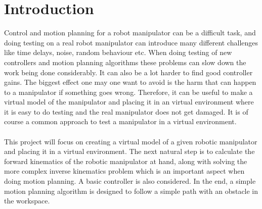 \chapter{Introduction}

Control and motion planning for a robot manipulator can be a difficult task, and doing testing on a real robot manipulator can introduce many different challenges like time delays, noise, random behaviour etc. When doing testing of new controllers and motion planning algorithms these problems can slow down the work being done considerably. It can also be a lot harder to find good controller gains. The biggest effect one may one want to avoid is the harm that can happen to a manipulator if something goes wrong. Therefore, it can be useful to make a virtual model of the manipulator and placing it in an virtual environment where it is easy to do testing and the real manipulator does not get damaged. It is of course a common approach to test a manipulator in a virtual environment.\\\\
This project will focus on creating a virtual model of a given robotic manipulator and placing it in a virtual environment. The next natural step is to calculate the forward kinematics of the robotic manipulator at hand, along with solving the more complex inverse kinematics problem which is an important aspect when doing motion planning. A basic controller is also considered. In the end, a simple motion planning algorithm is designed to follow a simple path with an obstacle in the workspace.
    





